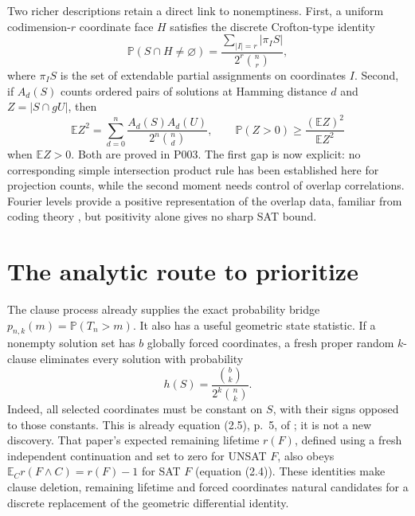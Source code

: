 \documentclass[11pt,a4paper]{article}
\begin{document}
Two richer descriptions retain a direct link to nonemptiness. First, a
uniform codimension-$r$ coordinate face $H$ satisfies the discrete
Crofton-type identity
\begin{equation}
 \mathbb P(S\cap H\ne\varnothing)
 =\frac{\sum_{|I|=r}|\pi_I S|}{2^r\binom nr},
 \label{eq:memo-crofton}
\end{equation}
where $\pi_I S$ is the set of extendable partial assignments on coordinates
$I$. Second, if $A_d(S)$ counts ordered pairs of solutions at Hamming
distance $d$ and $Z=|S\cap gU|$, then
\begin{equation}
 \mathbb E Z^2=\sum_{d=0}^n
       \frac{A_d(S)A_d(U)}{2^n\binom nd},\qquad
 \mathbb P(Z>0)\ge\frac{(\mathbb E Z)^2}{\mathbb E Z^2}
 \label{eq:memo-overlap}
\end{equation}
when $\mathbb E Z>0$. Both are proved in P003. The first gap is now explicit:
no corresponding simple intersection product rule has been established here
for projection counts, while the second moment needs control of overlap
correlations. Fourier levels provide a
positive representation of the overlap data, familiar from coding theory
\citep[Section 2.1]{navon2007}, but positivity alone gives no sharp SAT bound.

\section{The analytic route to prioritize}
The clause process already supplies the exact probability bridge
$p_{n,k}(m)=\mathbb P(T_n>m)$. It also has a useful geometric state statistic.
If a nonempty solution set has $b$ globally forced coordinates, a fresh
proper random $k$-clause eliminates every solution with probability
\begin{equation}
 h(S)=\frac{\binom bk}{2^k\binom nk}.
 \label{eq:memo-hazard}
\end{equation}
Indeed, all selected coordinates must be constant on $S$, with their signs
opposed to those constants. This is already equation (2.5), p.~5, of
\citet{carenini2026}; it is not a new discovery. That paper's expected
remaining lifetime $r(F)$, defined using a fresh independent continuation
and set to zero for UNSAT $F$, also obeys
$\mathbb E_C r(F\land C)=r(F)-1$ for SAT $F$ (equation (2.4)). These identities
make clause deletion, remaining lifetime and forced coordinates natural
candidates for a discrete replacement of the geometric differential identity.
\end{document}
